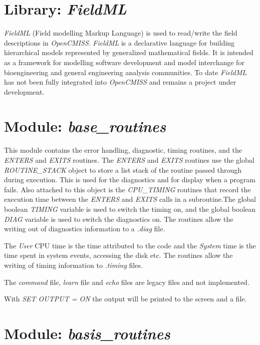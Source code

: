\section{Library: \emph{FieldML}}
\label{sec:fieldml}

\emph{FieldML} (Field modelling Markup Language) is used to read/write the field 
descriptions in \emph{OpenCMISS}. \emph{FieldML} is a declarative language for building 
hierarchical models represented by generalized mathematical fields. It is intended 
as a framework for modelling software development and model interchange for 
bioengineering and general engineering analysis communities. To date \emph{FieldML} 
has not been fully integrated into \emph{OpenCMISS} and remains a project under 
development.


\section{Module: \emph{base\_routines}}
\label{sec:baseroutines}

This module contains the error handling, diagnostic, timing routines, and 
the \emph{ENTERS} and \emph{EXITS} routines. The \emph{ENTERS} and 
\emph{EXITS} routines use the global \emph{ROUTINE\_STACK} object to store 
a list stack of the routine passed through during execution. This is used 
for the diagnostics and for display when a program fails. Also attached to 
this object is the \emph{CPU\_TIMING} routines that record the execution time 
between the \emph{ENTERS} and \emph{EXITS} calls in a subroutine.The global 
boolean \emph{TIMING} variable is used to switch the timing on, and the global 
boolean \emph{DIAG} variable is used to switch the diagnostics on. The routines
allow the writing out of diagnostics information to a \emph{.diag} file.

The \emph{User} CPU time is the time attributed to the code and the \emph{System} time 
is the time spent in system events, accessing the disk etc. The routines 
allow the writing of timing information to \emph{.timing} files.

The \emph{command} file, \emph{learn} file and \emph{echo} files are legacy files and not
implemented.

With \emph{SET OUTPUT = ON} the output will be printed to the screen and a file.


\section{Module: \emph{basis\_routines}}
\label{sec:basisroutines}

